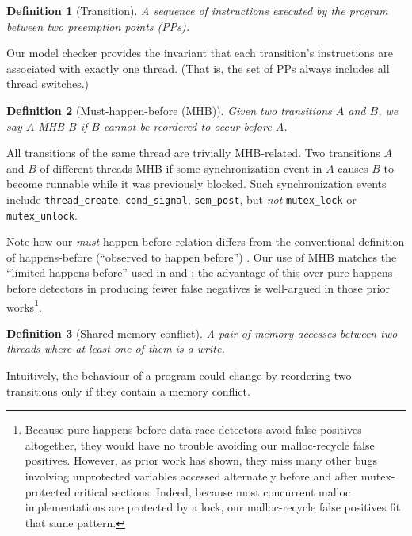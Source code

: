 \documentclass[pldi]{sigplanconf-pldi15}
\newtheorem{definition}{Definition}
\begin{document}
\begin{definition}[Transition]
A sequence of instructions executed by the program between two preemption points (PPs).
\label{def:transition}
\end{definition}
Our model checker provides the invariant that each transition's instructions are associated with exactly one thread. (That is, the set of PPs always includes all thread switches.)

\begin{definition}[Must-happen-before (MHB)]
	Given two transitions $A$ and $B$, we say $A$ MHB $B$ if $B$ cannot be reordered to occur before $A$.
\end{definition}
All transitions of the same thread are trivially MHB-related.
Two transitions $A$ and $B$ of different threads MHB if some synchronization event in $A$ causes $B$ to become runnable while it was previously blocked. Such synchronization events include {\tt thread\_create}, {\tt cond\_signal}, {\tt sem\_post}, but {\em not} {\tt mutex\_lock} or {\tt mutex\_unlock}.

Note how our {\em must}-happen-before relation differs from the conventional definition of happens-before (``observed to happen before'') \cite{lamport-clocks}.
Our use of MHB matches the ``limited happens-before'' used in \cite{hybriddatarace} and \cite{tsan};
the advantage of this over pure-happens-before detectors in producing fewer false negatives is well-argued in those prior works\footnote{
Because pure-happens-before data race detectors avoid false positives altogether, they would have no trouble avoiding our malloc-recycle false positives.
However, as prior work has shown, they miss many other bugs involving unprotected variables accessed alternately before and after mutex-protected critical sections.
Indeed, because most concurrent malloc implementations are protected by a lock, our malloc-recycle false positives fit that same pattern.
}.

\begin{definition}[Shared memory conflict]
A pair of memory accesses between two threads where at least one of them is a write.
\end{definition}
Intuitively, the behaviour of a program could change by reordering two transitions only if they contain a memory conflict.
\end{document}
